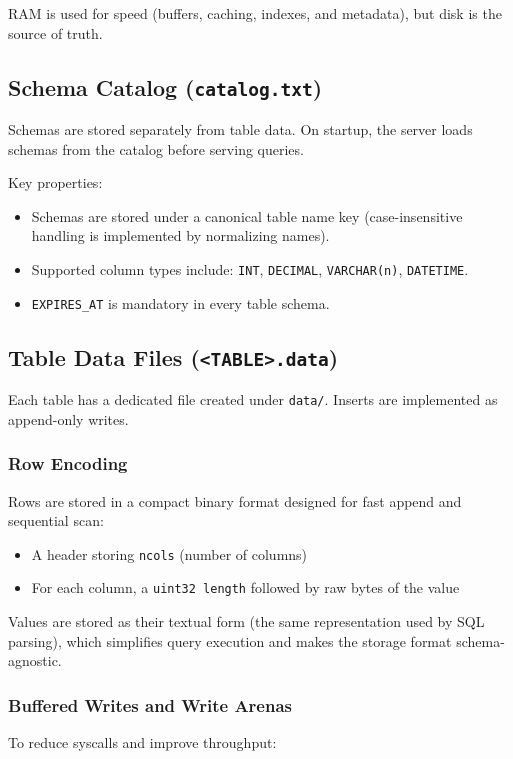 \documentclass[11pt]{article}
\begin{document}
RAM is used for speed (buffers, caching, indexes, and metadata), but disk is the source of truth.

\subsection{Schema Catalog (\texttt{catalog.txt})}
Schemas are stored separately from table data. On startup, the server loads schemas from the catalog before serving queries.

Key properties:
\begin{itemize}[leftmargin=*]
\item Schemas are stored under a canonical table name key (case-insensitive handling is implemented by normalizing names).
\item Supported column types include: \texttt{INT}, \texttt{DECIMAL}, \texttt{VARCHAR(n)}, \texttt{DATETIME}.
\item \texttt{EXPIRES\_AT} is mandatory in every table schema.
\end{itemize}

\subsection{Table Data Files (\texttt{<TABLE>.data})}
Each table has a dedicated file created under \texttt{data/}. Inserts are implemented as append-only writes.

\subsubsection{Row Encoding}
Rows are stored in a compact binary format designed for fast append and sequential scan:

\begin{itemize}[leftmargin=*]
\item A header storing \texttt{ncols} (number of columns)
\item For each column, a \texttt{uint32 length} followed by raw bytes of the value
\end{itemize}

Values are stored as their textual form (the same representation used by SQL parsing), which simplifies query execution and makes the storage format schema-agnostic.

\subsubsection{Buffered Writes and Write Arenas}
To reduce syscalls and improve throughput:
\end{document}
